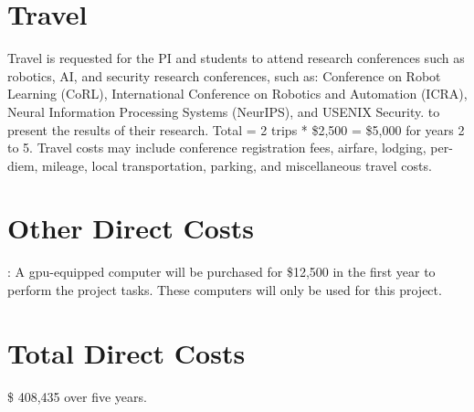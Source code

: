  
\section*{Travel}
Travel is requested for the PI and students to attend research conferences such as robotics, AI, and security research conferences, such as:
Conference on Robot Learning (CoRL),
International Conference on Robotics and Automation (ICRA),
Neural Information Processing Systems (NeurIPS), and
USENIX Security.
to present the results of their research. 
Total = 2 trips * \$2,500 = \$5,000 for years 2 to 5. Travel costs may include conference registration fees, airfare, lodging, per-diem, mileage, local transportation, parking, and miscellaneous travel costs. 

 





 
\section*{Other Direct Costs}

: A gpu-equipped computer will be purchased for \$12,500 in the first year to perform the project tasks. These computers will only be used for this project.





\section*{Total Direct Costs}

\$  408,435 over five years. 


